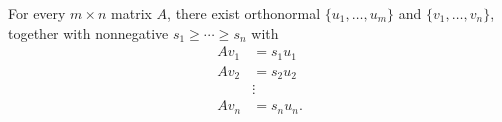 \documentclass[10pt]{article}
\begin{document}
For every $m \times n$ matrix $A$, there exist orthonormal $\{u_1,\ldots,u_m\}$ and $\{v_1,\ldots,v_n\}$, together with nonnegative $s_1 \ge \cdots \ge s_n$ with
\begin{align*}
Av_1 &= s_1 u_1\\
Av_2 &= s_2 u_2\\
&\vdots\\
Av_n &= s_n u_n.
\end{align*}
\end{document}

